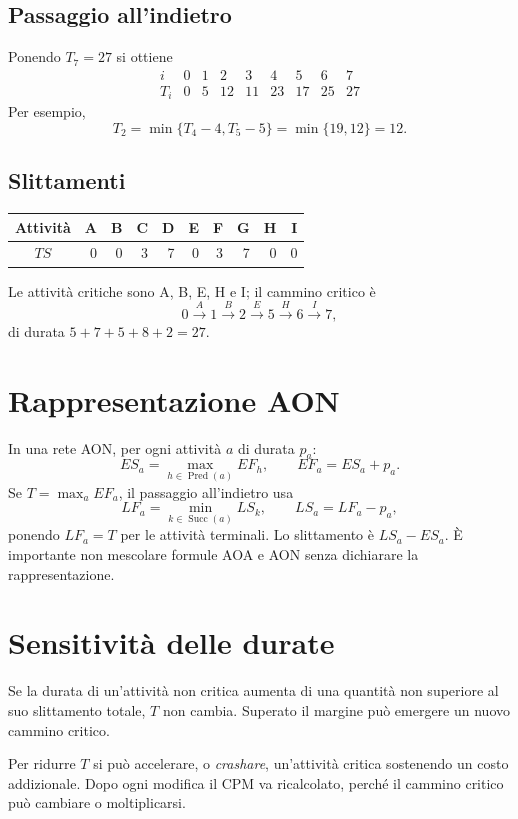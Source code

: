 \documentclass[11pt,a4paper]{article}
\begin{document}
\subsection{Passaggio all'indietro}
Ponendo $T_7=27$ si ottiene
\[\begin{array}{c|rrrrrrrr}i&0&1&2&3&4&5&6&7\\\hline T_i&0&5&12&11&23&17&25&27\end{array}\]
Per esempio,
\[T_2=\min\{T_4-4,T_5-5\}=\min\{19,12\}=12.\]

\subsection{Slittamenti}
\begin{center}\begin{tabular}{crrrrrrrrr}\toprule Attività&A&B&C&D&E&F&G&H&I\\\midrule $TS$&0&0&3&7&0&3&7&0&0\\\bottomrule\end{tabular}\end{center}
Le attività critiche sono A, B, E, H e I; il cammino critico è
\[0\xrightarrow{A}1\xrightarrow{B}2\xrightarrow{E}5\xrightarrow{H}6\xrightarrow{I}7,\]
di durata $5+7+5+8+2=27$.

\section{Rappresentazione AON}
In una rete AON, per ogni attività $a$ di durata $p_a$:
\[ES_a=\max_{h\in\operatorname{Pred}(a)}EF_h,\qquad EF_a=ES_a+p_a.\]
Se $T=\max_a EF_a$, il passaggio all'indietro usa
\[LF_a=\min_{k\in\operatorname{Succ}(a)}LS_k,\qquad LS_a=LF_a-p_a,\]
ponendo $LF_a=T$ per le attività terminali. Lo slittamento è $LS_a-ES_a$. È importante non mescolare formule AOA e AON senza dichiarare la rappresentazione.

\section{Sensitività delle durate}
Se la durata di un'attività non critica aumenta di una quantità non superiore al suo slittamento totale, $T$ non cambia. Superato il margine può emergere un nuovo cammino critico.

Per ridurre $T$ si può accelerare, o \emph{crashare}, un'attività critica sostenendo un costo addizionale. Dopo ogni modifica il CPM va ricalcolato, perché il cammino critico può cambiare o moltiplicarsi.
\end{document}
